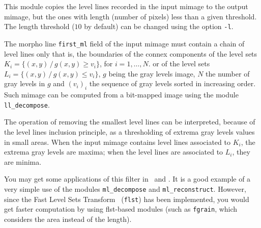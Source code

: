 This module copies the level lines  recorded in the 
input mimage to the output mimage, but the ones with length (number of pixels)
less than a given threshold. 
The length threshold ($10$ by default) can be changed using the option
\verb+-l+.

The morpho line \verb+first_ml+ field of the input mimage must contain a
chain of level lines only that is, the boundaries of the connex components 
of the level sets 
$K_i=\{ (x,y)\,/\, g(x,y)\geq v_i\}$, for $i=1,\ldots,N$.
or of the level sets
$L_i=\{ (x,y)\,/\, g(x,y)\leq v_i\}$,
$g$ being the gray levels image, $N$ the number of gray levels in $g$
and $(v_i)_i$ the sequence of gray levels sorted in increasing order.
Such mimage can be computed from a bit-mapped image using the module
\verb+ll_decompose+.

The operation of removing the smallest level lines can be interpreted, because
of the level lines inclusion principle, as a thresholding of extrema gray
levels values in small areas.
When the input mimage contains level lines associated to $K_i$, the extrema
gray levels are maxima; when the level lines are associated to $L_i$, they
are minima.

You may get some applications of this filter in~\cite{froment:perceptible}
and \cite{froment:functional}.
It is a good example of a very simple use of the modules \verb+ml_decompose+ and
\verb+ml_reconstruct+. However, since the Fast Level Sets 
Transform~\cite{monasse.guichard:fast} (\verb+flst+) has been implemented, 
you would get faster computation by using flst-based modules 
(such as \verb+fgrain+, which considers the area instead of the length).